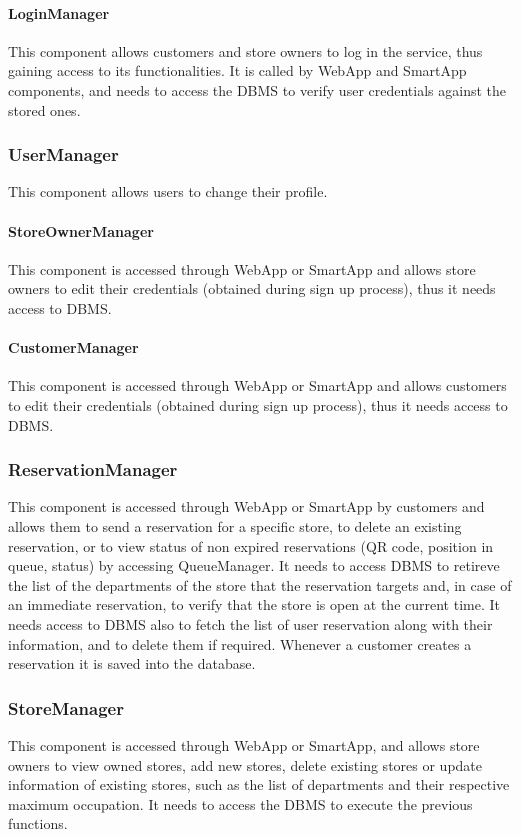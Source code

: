 \paragraph{LoginManager}
This component allows customers and store owners to log in the service, thus gaining access to its functionalities. It is called by WebApp and SmartApp components, and needs to access the DBMS to verify user credentials against the stored ones.
\subsubsection{UserManager}
This component allows users to change their profile.
\paragraph{StoreOwnerManager}
This component is accessed through WebApp or SmartApp and allows store owners to edit their credentials (obtained during sign up process), thus it needs access to DBMS.
\paragraph{CustomerManager}
This component is accessed through WebApp or SmartApp and allows customers to edit their credentials (obtained during sign up process), thus it needs access to DBMS.
\subsubsection{ReservationManager}
This component is accessed through WebApp or SmartApp by customers and allows them to send a reservation for a specific store, to delete an existing reservation, or to view status of non expired reservations (QR code, position in queue, status) by accessing QueueManager. It needs to access DBMS to retireve the list of the departments of the store that the reservation targets and, in case of an immediate reservation, to verify that the store is open at the current time. It needs access to DBMS also to fetch the list of user reservation along with their information, and to delete them if required. Whenever a customer creates a reservation it is saved into the database.
\subsubsection{StoreManager}
This component is accessed through WebApp or SmartApp, and allows store owners to view owned stores, add new stores, delete existing stores or update information of existing stores, such as the list of departments and their respective maximum occupation. It needs to access the DBMS to execute the previous functions.
